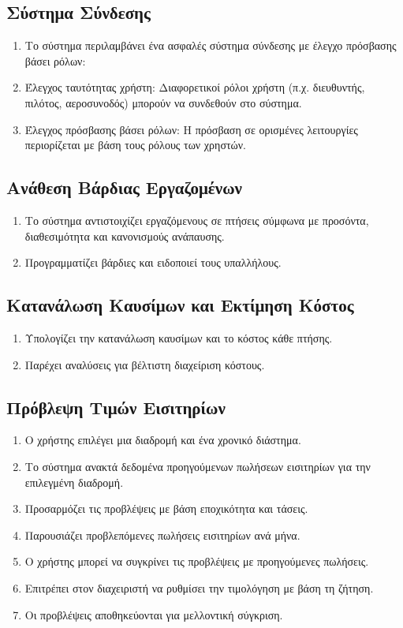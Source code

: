 \documentclass{article}
\begin{document}
	\subsection{Σύστημα Σύνδεσης}
	\begin{enumerate}
		\item Το σύστημα περιλαμβάνει ένα ασφαλές σύστημα σύνδεσης με έλεγχο πρόσβασης βάσει ρόλων:
		\item Έλεγχος ταυτότητας χρήστη: Διαφορετικοί ρόλοι χρήστη (π.χ. διευθυντής, πιλότος, αεροσυνοδός) μπορούν να συνδεθούν στο σύστημα.
		\item Έλεγχος πρόσβασης βάσει ρόλων: Η πρόσβαση σε ορισμένες λειτουργίες περιορίζεται με βάση τους ρόλους των χρηστών.
	\end{enumerate}
	
	\subsection{Ανάθεση Βάρδιας Εργαζομένων}
	\begin{enumerate}
		\item Το σύστημα αντιστοιχίζει εργαζόμενους σε πτήσεις σύμφωνα με προσόντα, διαθεσιμότητα και κανονισμούς ανάπαυσης.
		\item Προγραμματίζει βάρδιες και ειδοποιεί τους υπαλλήλους.
	\end{enumerate}
	
	\subsection{Κατανάλωση Καυσίμων και Εκτίμηση Κόστος}
	\begin{enumerate}
		\item Υπολογίζει την κατανάλωση καυσίμων και το κόστος κάθε πτήσης.
		\item Παρέχει αναλύσεις για βέλτιστη διαχείριση κόστους.
	\end{enumerate}
	
	\subsection{Πρόβλεψη Τιμών Εισιτηρίων}
	\begin{enumerate}
		\item Ο χρήστης επιλέγει μια διαδρομή και ένα χρονικό διάστημα. 
		\item Το σύστημα ανακτά δεδομένα προηγούμενων πωλήσεων εισιτηρίων για την επιλεγμένη διαδρομή.
		\item Προσαρμόζει τις προβλέψεις με βάση εποχικότητα και τάσεις. 
		\item Παρουσιάζει προβλεπόμενες πωλήσεις εισιτηρίων ανά μήνα. 
		\item Ο χρήστης μπορεί να συγκρίνει τις προβλέψεις με προηγούμενες πωλήσεις. 
		\item Επιτρέπει στον διαχειριστή να ρυθμίσει την τιμολόγηση με βάση τη ζήτηση. 
		\item Οι προβλέψεις αποθηκεύονται για μελλοντική σύγκριση.  
	\end{enumerate}
	
\end{document}
